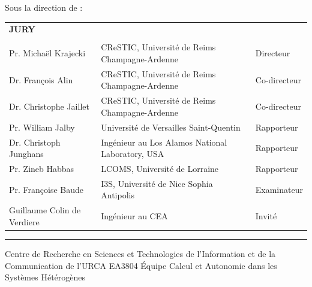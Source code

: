 \documentclass[11pt,a4paper]{book}
\begin{document}
{%
{
	Sous la direction de :\\ 
	\textbf{\phdDirector}
	\vspace{0.5cm}
	\vspace{\fill}
}

{
\normalsize
\begin{tabular}{l l l}
		\textbf{JURY} &  & \\
		&&\\
		Pr. Michaël Krajecki & CReSTIC, Université de Reims Champagne-Ardenne & Directeur \\
		Dr. François Alin & CReSTIC, Université de Reims Champagne-Ardenne & Co-directeur  \\
		Dr. Christophe Jaillet & CReSTIC, Université de Reims Champagne-Ardenne & Co-directeur \\
		Pr. William Jalby & Université de Versailles Saint-Quentin & Rapporteur\\
		Dr. Christoph Junghans & Ingénieur au Los Alamos National Laboratory, USA & Rapporteur \\
		Pr. Zineb Habbas & LCOMS, Université de Lorraine & Rapporteur \\ 
		Pr. Françoise Baude & I3S, Université de Nice Sophia Antipolis& Examinateur\\
		Guillaume Colin de Verdiere & Ingénieur au CEA & Invit\'e
\end{tabular}
\vspace{0.5cm}
\hrule
\vspace{0.3cm}
}

{
	Centre de Recherche en Sciences et Technologies de l'Information et de la Communication de l'URCA EA3804
}
{
	\'Equipe Calcul et Autonomie dans les Systèmes Hétérogènes
}

}

\clearpage 
{}
\thispagestyle{empty}

\frontmatter



%


\tableofcontents

\mainmatter

\listoffigures
\end{document}
